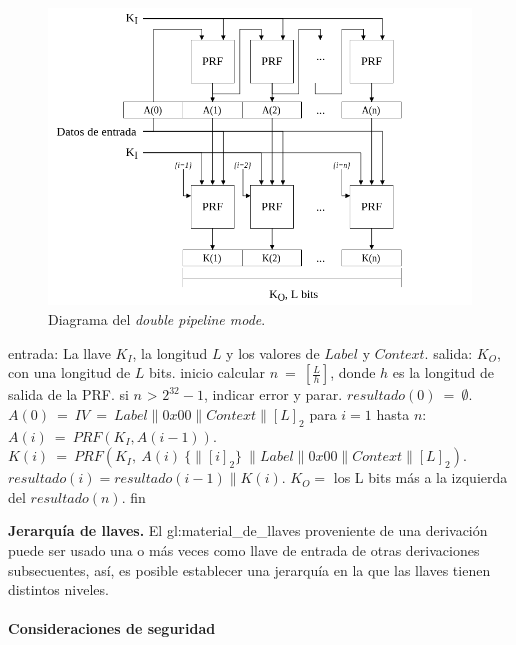 \begin{figure}[H]
  \begin{center}
    \includegraphics[width=0.75\linewidth]{diagramas/dpipeline_mode}
    \caption{Diagrama del \textit{double pipeline mode}.}
    \label{diagrama_dpipeline_mode}
   \end{center}
\end{figure}

\begin{pseudocodigo}[caption={Funcionamiento del \textit{double pipeline mode}.}, 
label={mi:3}]
  entrada:   La llave $K_I$, la longitud $L$ y los valores de $Label$ y $Context$.
  salida:    $K_O$, con una longitud de $L$ bits.
  inicio
    calcular $n\: =\: [\frac{L}{h}]$, donde $h$ es la longitud de salida de la PRF.
    si $n$ > $2^{32}-1$, indicar error y parar.
    $resultado(0)\: =\: \emptyset$.
    $A(0)\: =\: IV\: =\: Label \parallel 0x00 \parallel Context \parallel {[L]}_2$
    para $i=1$ hasta $n$:
      $A(i)\: =\: PRF(K_I, A(i-1))$.
      $K(i)\: =\: PRF(K_I,\: A(i)\: \{\parallel {[i]}_2\}\: \parallel Label \parallel 0x00 \parallel Context \parallel {[L]}_2)$.
      $resultado(i) = resultado(i-1) \parallel K(i)$.
    $K_O =$ los L bits más a la izquierda del $resultado(n)$. 
  fin
\end{pseudocodigo}

\textbf{Jerarquía de llaves.}
El \gls{gl:material_de_llaves} proveniente de una derivación puede ser usado 
una o más veces como llave de entrada de otras derivaciones subsecuentes, así, 
es posible establecer una jerarquía en la que las llaves tienen distintos 
niveles.

\paragraph{Consideraciones de seguridad\newline}


